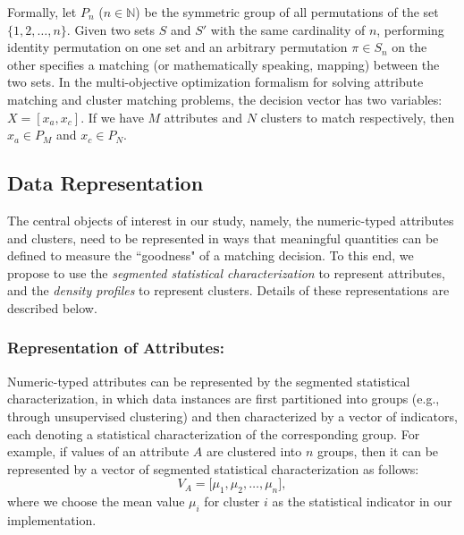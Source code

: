 Formally, let $P_n$ ($n\in \mathbb{N}$) be the symmetric group of all permutations of the set $\{1, 2, \ldots, n\}$. Given two sets $S$ and $S'$ with the same cardinality of $n$, performing identity permutation on one set and an arbitrary permutation $\pi \in S_n$ on the other specifies a matching (or mathematically speaking, mapping) between the two sets.
In the multi-objective optimization formalism for solving attribute matching and cluster matching problems, the decision vector has two variables: $X=[x_a, x_c]$. If we have $M$ attributes and $N$ clusters to match respectively, then $x_a \in P_M$ and $x_c\in P_N$.


\subsection{Data Representation}
The central objects of interest in our study, namely, the numeric-typed attributes and clusters, need to be represented in ways that meaningful quantities can be defined to measure the ``goodness" of a matching decision. To this end, we propose to use the \emph{segmented statistical characterization} to represent attributes, and the \emph{density profiles} to represent clusters. Details of these representations are described below.
\subsubsection{Representation of Attributes:}
Numeric-typed attributes can be represented by the segmented statistical characterization, in which data instances are first partitioned into groups (e.g., through unsupervised clustering) and then characterized by a vector of indicators, each denoting a statistical characterization of the corresponding group. For example, if values of an attribute $A$ are clustered into $n$ groups, then it can be represented by a vector of segmented statistical characterization as follows:
\[
V_A=\bigg[\mu_1, \mu_2, \ldots, \mu_n\bigg],
\]
where we choose the mean value $\mu_i$ for cluster $i$ as the statistical indicator in our implementation.

